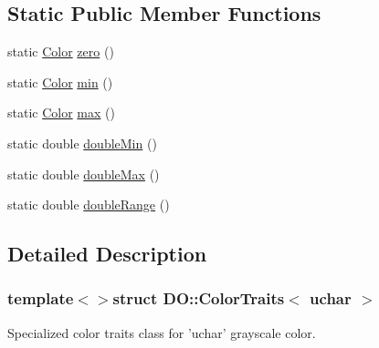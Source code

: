 \subsection*{Static Public Member Functions}
\begin{DoxyCompactItemize}
\item 
static \hyperlink{struct_d_o_1_1_color_traits_3_01uchar_01_4_a6a6b36f9ac287bde85a4a9a4a0cd4430}{Color} \hyperlink{struct_d_o_1_1_color_traits_3_01uchar_01_4_a57b00f8db42515f404e06ab933932125}{zero} ()
\item 
static \hyperlink{struct_d_o_1_1_color_traits_3_01uchar_01_4_a6a6b36f9ac287bde85a4a9a4a0cd4430}{Color} \hyperlink{struct_d_o_1_1_color_traits_3_01uchar_01_4_a1cd81f912af766f8004e4d5a82a7128b}{min} ()
\item 
static \hyperlink{struct_d_o_1_1_color_traits_3_01uchar_01_4_a6a6b36f9ac287bde85a4a9a4a0cd4430}{Color} \hyperlink{struct_d_o_1_1_color_traits_3_01uchar_01_4_aded391d5e231096e135e08760c0fbeb6}{max} ()
\item 
static double \hyperlink{struct_d_o_1_1_color_traits_3_01uchar_01_4_aa122aba748bfd453a27d2c30b368dbc3}{double\-Min} ()
\item 
static double \hyperlink{struct_d_o_1_1_color_traits_3_01uchar_01_4_ab9fb6b1bb12e23b725453a69f6193c30}{double\-Max} ()
\item 
static double \hyperlink{struct_d_o_1_1_color_traits_3_01uchar_01_4_aed64f95e634b8dac0ae5a0aed2b45740}{double\-Range} ()
\end{DoxyCompactItemize}


\subsection{Detailed Description}
\subsubsection*{template$<$$>$struct D\-O\-::\-Color\-Traits$<$ uchar $>$}

Specialized color traits class for 'uchar' grayscale color. 

